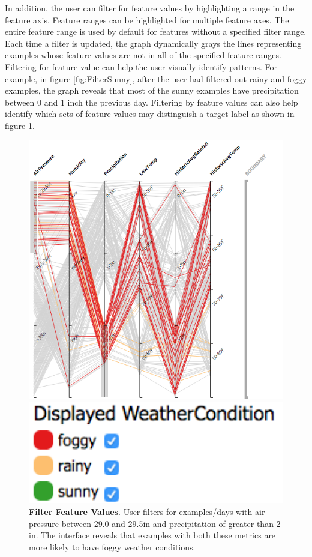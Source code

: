 In addition, the user can filter for feature values by highlighting a range in the feature axis. Feature ranges can be highlighted for multiple feature axes. The entire feature range is used by default for features without a specified filter range. Each time a filter is updated, the graph dynamically grays the lines representing examples whose feature values are not in all of the specified feature ranges. Filtering for feature value can help the user visually identify patterns. For example, in figure \ref{fig:FilterSunny}, after the user had filtered out rainy and foggy examples, the graph reveals that most of the sunny examples have precipitation between 0 and 1 inch the previous day. Filtering by feature values can also help identify which sets of feature values may distinguish a target label as shown in figure \ref{fig:FilterValues}.

\begin{figure}[!htbp]
    \centering
    \begin{minipage}{0.7\textwidth}
        \centering
        \includegraphics[width=.85\textwidth]{FilterValues}
    \end{minipage}\hfill
    \begin{minipage}{0.3\textwidth}
        \centering
        \includegraphics[width=1\textwidth]{FilterValuesLegend}
    \end{minipage}
    \caption{\textbf{Filter Feature Values}. User filters for examples/days with air pressure between 29.0 and 29.5in and precipitation of greater than 2 in. The interface reveals that examples with both these metrics are more likely to have foggy weather conditions.}
    \label{fig:FilterValues}
\end{figure}

